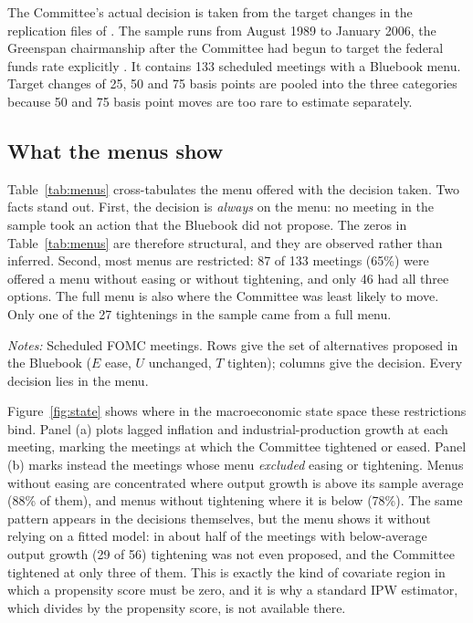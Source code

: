 The Committee's actual decision is taken from the target changes in the replication files of
\citet{angrist2018}. The sample runs from August 1989 to January 2006, the Greenspan chairmanship after the
Committee had begun to target the federal funds rate explicitly \citep{romer2004}. It contains 133 scheduled
meetings with a Bluebook menu. Target changes of 25, 50 and 75 basis points are pooled into the three categories
because 50 and 75 basis point moves are too rare to estimate separately.

\subsection{What the menus show}

Table~\ref{tab:menus} cross-tabulates the menu offered with the decision taken. Two facts stand out. First, the
decision is \emph{always} on the menu: no meeting in the sample took an action that the Bluebook did not propose.
The zeros in Table~\ref{tab:menus} are therefore structural, and they are observed rather than inferred. Second, most
menus are restricted: 87 of 133 meetings (65\%) were offered a menu without easing or without tightening, and only
46 had all three options. The full menu is also where the Committee was least likely to move. Only one of the 27
tightenings in the sample came from a full menu.

\begin{table}[!htbp]
  \centering
  \caption{Bluebook menus and FOMC decisions, August 1989 -- January 2006}\label{tab:menus}
  \par\medskip
  \begin{minipage}{0.8\linewidth}\footnotesize
  \emph{Notes:} Scheduled FOMC meetings. Rows give the set of alternatives proposed in the Bluebook ($E$ ease,
  $U$ unchanged, $T$ tighten); columns give the decision. Every decision lies in the menu.
  \end{minipage}
\end{table}

Figure~\ref{fig:state} shows where in the macroeconomic state space these restrictions bind. Panel (a) plots
lagged inflation and industrial-production growth at each meeting, marking the meetings at which the Committee
tightened or eased. Panel (b) marks instead the meetings whose menu \emph{excluded} easing or tightening. Menus
without easing are concentrated where output growth is above its sample average (88\% of them), and menus without
tightening where it is below (78\%). The same pattern appears in the decisions themselves, but the menu shows it
without relying on a fitted model: in about half of the meetings with below-average output growth (29 of 56) tightening
was not even proposed, and the Committee tightened at only three of them. This is
exactly the kind of covariate region in which a propensity score must be zero, and it is why a standard IPW
estimator, which divides by the propensity score, is not available there.

